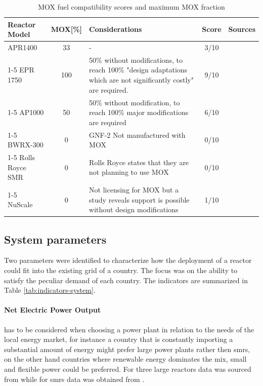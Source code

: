 \begin{table}[!hb]
    \centering
    \begin{tabularx}{\textwidth}{l c X c c}
        \toprule
        \textbf{Reactor Model} & \textbf{MOX[\%]} & \textbf{Considerations} & \textbf{Score} & Sources \\
        \midrule
        APR1400         & 33 & - & 3/10 & \cite{iaea2025aris} \\
        \cmidrule(lr){1-5}
        EPR 1750        & 100 & 50\% without modifications, to reach 100\% "design adaptations which are not significantly costly" are required.  & 9/10 & \cite{iaea2025aris, osti_22257897} \\
        \cmidrule(lr){1-5}
        AP1000          & 50 & 50\% without modification, to reach 100\% major modifications are required & 6/10 & \cite{iaea2025aris, FETTERMAN2009324} \\
        \cmidrule(lr){1-5}
        BWRX-300        & 0 & GNF-2 Not manufactured with MOX & 0/10 & \cite{CNSC_BWRX300_Fuel_Design} \\
        \cmidrule(lr){1-5}
        Rolls Royce SMR & 0 & Rolls Royce states that they are not planning to use MOX & 0/10 & \cite{RollsRoyce_SMR_GDA_Consultation} \\
        \cmidrule(lr){1-5}
        NuScale         & 0 & Not licensing for MOX but a study reveals support is possible without design modifications & 1/10 & \cite{NRC_ML17007A001, NuScale_MOX_2016} \\
        \bottomrule
    \end{tabularx}
    \caption{MOX fuel compatibility scores and maximum MOX fraction}
    \label{tab:mox-compatibility}
\end{table}

\subsection{System parameters}
Two parameters were identified to characterize how the deployment of a reactor could fit into the existing grid of a country. The focus was on the ability to satisfy the peculiar demand of each country. The indicators are summarized in Table \ref{tab:indicators-system}.

\paragraph{Net Electric Power Output} has to be considered when choosing a power plant in relation to the needs of the local energy market, for instance a country that is constantly importing a substantial amount of energy might prefer large power plants rather then \glspl{smr}, on the other hand countries where renewable energy dominates the mix, small and flexible power could be preferred. For three large reactors data was sourced from \cite{IAEA_PRIS_2025} while for \glspl{smr} data was obtained from \cite{iaea2025aris}.


